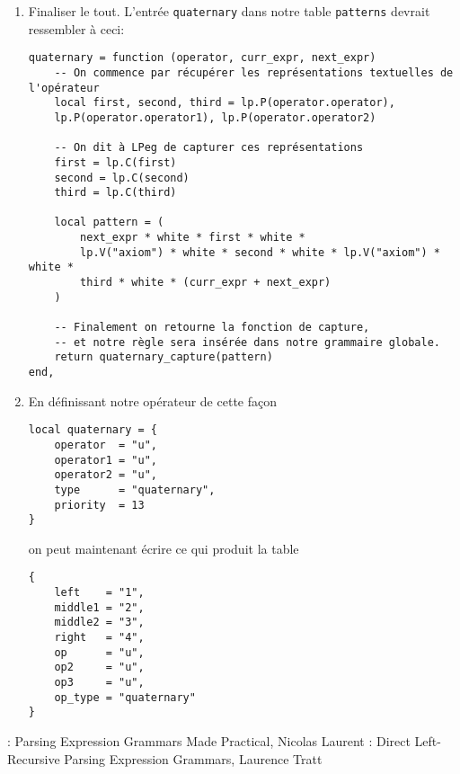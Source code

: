 \documentclass{article}
\begin{document}
\begin{enumerate}
	\begin{verbatim}
-- p est la règle
function quaternary_capture (p)
	-- On utilise l'opérateur de capture de LPeg
	return p / function (left, op1, middle1, op2, middle2, op3, right)
		-- Et on retourne juste une table.
		-- A savoir: on pourrait utiliser la fonction lpeg.Ct (Capture table),
		-- cependant il est préférable de définir nos clés nous-même, car lpeg.Ct
		-- retourne une table dont les clés sont des nombres (1, 2, ...)
		return {
			left    = left,
			op      = op1,
			op2     = op2,
			op3     = op3,
			middle1 = middle1,
			middle2 = middle2,
			right   = right,
			op_type = "quaternary"
		}
	end
end
	\end{verbatim}
	\item Finaliser le tout. L'entrée \lstinline|quaternary| dans notre table \lstinline|patterns| devrait ressembler à ceci:
	\begin{verbatim}
quaternary = function (operator, curr_expr, next_expr)
	-- On commence par récupérer les représentations textuelles de l'opérateur
	local first, second, third = lp.P(operator.operator), 
	lp.P(operator.operator1), lp.P(operator.operator2)
	
	-- On dit à LPeg de capturer ces représentations
	first = lp.C(first)
	second = lp.C(second)
	third = lp.C(third)
	
	local pattern = (
		next_expr * white * first * white *
		lp.V("axiom") * white * second * white * lp.V("axiom") * white *
		third * white * (curr_expr + next_expr)
	)
	
	-- Finalement on retourne la fonction de capture, 
	-- et notre règle sera insérée dans notre grammaire globale.
	return quaternary_capture(pattern)
end,
	\end{verbatim}
	\item En définissant notre opérateur de cette façon
	\begin{verbatim}
local quaternary = {
	operator  = "u",
	operator1 = "u",
	operator2 = "u",
	type      = "quaternary",
	priority  = 13
}
	\end{verbatim}
	on peut maintenant écrire  ce qui produit la table
	\begin{verbatim}
{
	left    = "1",
	middle1 = "2",
	middle2 = "3",
	right   = "4",
	op      = "u",
	op2     = "u",
	op3     = "u",
	op_type = "quaternary"
}
	\end{verbatim}
\end{enumerate}
\newpage
\noindent[1]: Parsing Expression Grammars Made Practical, Nicolas Laurent \newline
[2]: Direct Left-Recursive Parsing Expression Grammars, Laurence Tratt
\end{document}
